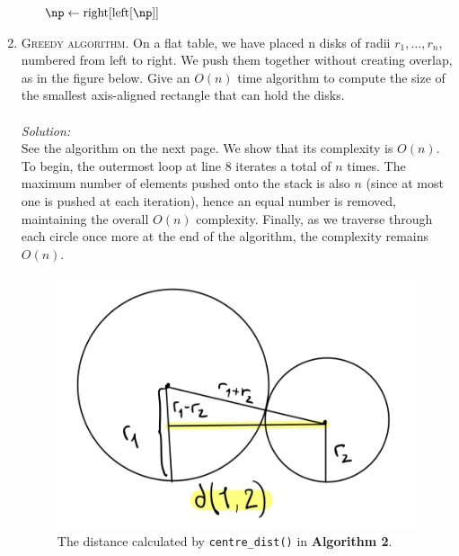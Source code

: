 \documentclass[12pt]{article}
\theoremstyle{definition}
\theoremstyle{remark}
\newcommand\sol{%
  \\ 
  \\
  \textit{Solution:}\\%
}
\begin{document}
\begin{enumerate}
\begin{enumerate}
\begin{algorithm}
    \BlankLine
    $\np \gets \text{right}[\text{left}[\np]]$ 
    
    
    
\end{algorithm}
\end{enumerate}
  \newpage 
  \item \textsc{Greedy algorithm}. On a flat table, we have placed n disks of radii $r_1, ..., r_n$, numbered from left to right. We push them together without creating overlap, as in the figure below. Give an $O(n)$ time algorithm to compute the size of the smallest axis-aligned rectangle that can hold the disks.
  \sol 
  See the algorithm on the next page. We show that its complexity is $O(n)$. To begin, the outermost loop at line 8 iterates a total of $n$ times. The maximum number of elements pushed onto the stack is also $n$ (since at most one is pushed at each iteration), hence an equal number is removed, maintaining the overall $O(n)$ complexity. Finally, as we traverse through each circle once more at the end of the algorithm, the complexity remains $O(n)$.
\begin{figure}
     \centering
     \includegraphics[scale=0.20]{A4-252.jpg}
     \caption{The distance calculated by \texttt{centre\_dist()} in \textbf{Algorithm 2}.} 
\end{figure}


\end{enumerate}
\end{document}
